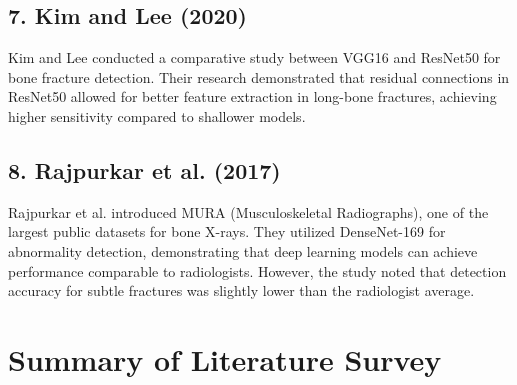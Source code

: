 \documentclass[a4paper,12pt]{report}
\begin{document}
    \subsection*{7. Kim and Lee (2020)}
    Kim and Lee conducted a comparative study between VGG16 and ResNet50 for bone fracture detection. Their research demonstrated that residual connections in ResNet50 allowed for better feature extraction in long-bone fractures, achieving higher sensitivity compared to shallower models.

    \subsection*{8. Rajpurkar et al. (2017)}
    Rajpurkar et al. introduced MURA (Musculoskeletal Radiographs), one of the largest public datasets for bone X-rays. They utilized DenseNet-169 for abnormality detection, demonstrating that deep learning models can achieve performance comparable to radiologists. However, the study noted that detection accuracy for subtle fractures was slightly lower than the radiologist average.


    \section{Summary of Literature Survey}
\end{document}
